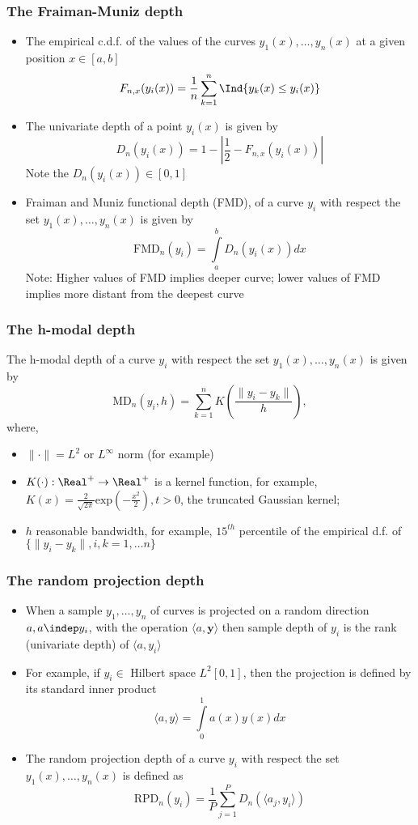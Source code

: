 \documentclass[10pt,dvipsnames,table]{beamer}
\begin{document}
\begin{frame}
\frametitle{The Fraiman-Muniz depth}
\small
\begin{itemize}
\item The empirical c.d.f. of the values of the curves $y_1(x), \dots , y_n(x)$ at a given position $x \in [a, b]$
\[ F_{n,x} (y_i (x)) = \frac{1}{n}\sum\limits_{k=1}^{n} \Ind\{ y_k(x) \leq y_i(x)\}\]
\pause
\item The univariate depth of a point $y_i(x)$ is given by
\[ D_n(y_i(x)) = 1 - \left| \frac{1}{2} - F_{n,x} (y_i (x)) \right| \]
Note the $D_n(y_i(x)) \in [0, 1]$
\pause
\item Fraiman and Muniz functional depth (FMD), of a curve $y_i$ with respect the set $y_1(x), \dots , y_n(x)$ is given by 
\[ \text{FMD}_n(y_i) = \int\limits_a^b D_n(y_i(x)) dx \]
Note: Higher values of FMD implies deeper curve; lower values of FMD implies more distant from the deepest curve
\end{itemize}
\end{frame}

\begin{frame}
\frametitle{The h-modal depth}
The h-modal depth of a curve $y_i$ with respect the set $y_1(x), \dots , y_n(x)$ is given by
\[ \text{MD}_n(y_i, h) = \sum\limits_{k = 1}^n K\left( \frac{\|y_i - y_k \|}{h} \right),\]
where, \begin{itemize}
\item $\|\cdot\| = L^2 \text{ or } L^{\infty}$ norm (for example)
\item $K(\cdot): \Real^{+} \rightarrow \Real^{+}$ is a kernel function, for example, $K(x) = \frac{2}{\sqrt{2\pi}} \text{exp}\left(-\frac{x^2}{2}\right), t > 0$, the truncated Gaussian kernel;
\item $h$ reasonable bandwidth, for example, $15^{th}$ percentile of the empirical d.f. of $\{ \|y_i - y_k \|, i, k = 1, \dots n \}$
\end{itemize}
\end{frame}

\begin{frame}
\frametitle{The random projection depth}
\begin{itemize}
\item When a sample $y_1, \dots, y_n$ of curves is projected on a random direction $a, a \indep y_i$, with the operation $ \langle a, \mathbf{y} \rangle$ then sample depth of $y_i$ is the rank (univariate depth) of $ \langle a, y_i \rangle$
\pause
\item For example, if $y_i \in \text{ Hilbert space } L^2[0,1]$, then the projection is defined by its standard inner product 
\[ \langle a, y \rangle = \int\limits_0^1 a(x) y(x) dx\]
\pause
\item The random projection depth of a curve $y_i$ with respect the set $y_1(x), \dots , y_n(x)$ is defined as
\[ \text{RPD}_n(y_i) = \frac{1}{P} \sum\limits_{j = 1}^P D_n(\langle a_j, y_i \rangle)\]
\end{itemize}
\end{frame}
\end{document}
